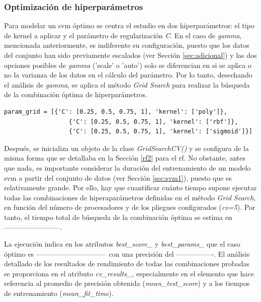 \subsubsection{Optimización de hiperparámetros}

Para modelar un \gls{svm} óptimo se centra el estudio en dos hiperparámetros: el tipo de kernel a aplicar y el parámetro de regularización \textit{C}. En el caso de \textit{gamma}, mencionada anteriormente, es indiferente su configuración, puesto que los datos del conjunto han sido previamente escalados (ver Sección \ref{sec:adicional}) y las dos opciones posibles de \textit{gamma} ('scale' o 'auto') solo se diferencian en si se aplica o no la varianza de los datos en el cálculo del parámetro. Por lo tanto, desechando el análisis de \textit{gamma}, se aplica el método \textit{Grid Search} para realizar la búsqueda de la combinación óptima de hiperparámetros.

\vspace{3mm}

\begin{lstlisting}[style=Python, caption={Cuadrícula de parámetros SVM}]
  param_grid = [{'C': [0.25, 0.5, 0.75, 1], 'kernel': ['poly']},
                  {'C': [0.25, 0.5, 0.75, 1], 'kernel': ['rbf']},
                  {'C': [0.25, 0.5, 0.75, 1], 'kernel': ['sigmoid']}]
\end{lstlisting}

\vspace{3mm}

Después, se inicializa un objeto de la clase \textit{GridSearchCV()} y se configura de la misma forma que se detallaba en la Sección \ref{rf2} para el \gls{rf}. No obstante, antes que nada, es importante considerar la duración del entrenamiento de un modelo \gls{svm} a partir del conjunto de datos (ver Sección \ref{sec:svm1}), puesto que es relativamente grande. Por ello, hay que cuantificar cuánto tiempo supone ejecutar todas las combinaciones de hiperaparámetros definidas en el método \textit{Grid Search}, en función del número de procesadores y de los pliegues configurados (\textit{cv=5}). Por tanto, el tiempo total de búsqueda de la combinación óptima se estima en ------------------------.

\vspace{3mm}

La ejecución indica en los atributos \textit{best\_score\_} y \textit{best\_params\_} que el caso óptimo es ------------------------------ con una precisión del ----------------. El análisis detallado de los resultados de rendimiento de todas las combinaciones probadas se proporciona en el atributo \textit{cv\_results\_}, especialmente en el elemento que hace referencia al promedio de precisión obtenida (\textit{mean\_test\_score}) y a los tiempos de entrenamiento (\textit{mean\_fit\_time}). 

